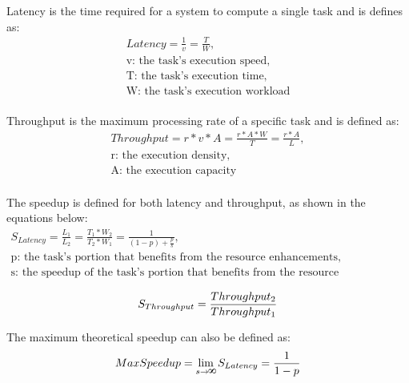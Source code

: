 Latency is the time required for a system to compute a single task and is defines as:
\begin{equation}
	\label{eqn:latency}
	\begin{split}
		Latency = \frac{1}{v} = \frac{T}{W},\\
		\mbox{v: the task's execution speed},\\
		\mbox{T: the task's execution time},\\
		\mbox{W: the task's execution workload}\\
	\end{split}
\end{equation}

Throughput is the maximum processing rate of a specific task and is defined as:
\begin{equation}
	\label{eqn:throughput}
	\begin{split}
		Throughput = r * v * A = \frac{r * A * W}{T} = \frac{r * A}{L},\\
		\mbox{r: the execution density},\\
		\mbox{A: the execution capacity}\\
	\end{split}
\end{equation}

The speedup is defined for both latency and throughput, as shown in the equations below:
\begin{equation}
	\label{eqn:latency-speedup}
	\begin{split}
		S_{Latency} = \frac{L_1}{L_2} = \frac{T_1 * W_2}{T_2 * W_1} = \frac{1}{(1 - p) + \frac{p}{s}},\\
		\mbox{p: the task's portion that benefits from the resource enhancements},\\
		\mbox{s: the speedup of the task's portion that benefits from the resource enhancements}\\
	\end{split}
\end{equation}
\begin{equation}
	\label{eqn:throughput-speedup}
	S_{Throughput} = \frac{Throughput_2}{Throughput_1}\\
\end{equation}

The maximum theoretical speedup can also be defined as:
\begin{equation}
	\label{eqn:max-speedup}
	MaxSpeedup = \lim_{s \to \infinity} S_{Latency} = \frac{1}{1 - p}\\
\end{equation}

